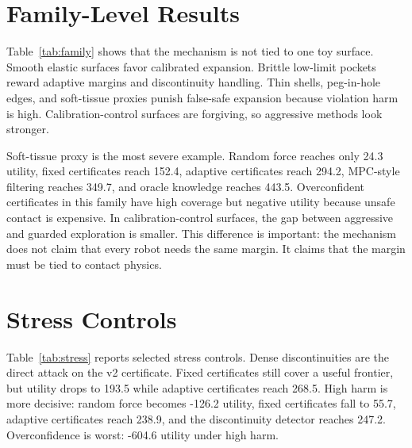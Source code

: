 \documentclass{article}
\begin{document}
\section{Family-Level Results}

Table~\ref{tab:family} shows that the mechanism is not tied to one toy surface.
Smooth elastic surfaces favor calibrated expansion. Brittle low-limit pockets
reward adaptive margins and discontinuity handling. Thin shells, peg-in-hole
edges, and soft-tissue proxies punish false-safe expansion because violation
harm is high. Calibration-control surfaces are forgiving, so aggressive methods
look stronger.

\begin{table}[h]
\centering
\scriptsize
{}
\caption{Family-level utility summary. The families expose different failure
modes: discontinuities, anisotropy, friction, deformation, snag hazards, narrow
edges, and soft-contact harm.}
\label{tab:family}
\end{table}

Soft-tissue proxy is the most severe example. Random force reaches only 24.3
utility, fixed certificates reach 152.4, adaptive certificates reach 294.2,
MPC-style filtering reaches 349.7, and oracle knowledge reaches 443.5.
Overconfident certificates in this family have high coverage but negative
utility because unsafe contact is expensive. In calibration-control surfaces,
the gap between aggressive and guarded exploration is smaller. This difference
is important: the mechanism does not claim that every robot needs the same
margin. It claims that the margin must be tied to contact physics.

\section{Stress Controls}

Table~\ref{tab:stress} reports selected stress controls. Dense
discontinuities are the direct attack on the v2 certificate. Fixed certificates
still cover a useful frontier, but utility drops to 193.5 while adaptive
certificates reach 268.5. High harm is more decisive: random force becomes
-126.2 utility, fixed certificates fall to 55.7, adaptive certificates reach
238.9, and the discontinuity detector reaches 247.2. Overconfidence is worst:
-604.6 utility under high harm.
\end{document}
